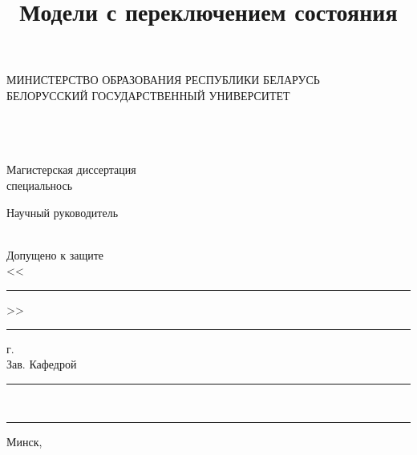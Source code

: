 \documentclass[a4paper,14pt]{extreport}
\title{Модели с переключением состояния}
\author{\@authorlast \@authorfirst}
\makeatletter
\newcommand*{\@authorfirst}{}
\newcommand*{\@authorlast}{}
\newcommand*{\@mentor}{}
\newcommand*{\@mentorjob}{}
\newcommand*{\@faculty}{}
\newcommand*{\@subfaculty}{}
\newcommand*{\@specialty}{}
\makeatother
\begin{document}
\begin{titlepage}
	\begin{center}
		\small{МИНИСТЕРСТВО ОБРАЗОВАНИЯ РЕСПУБЛИКИ БЕЛАРУСЬ}\\
		\small{БЕЛОРУССКИЙ ГОСУДАРСТВЕННЫЙ УНИВЕРСИТЕТ}\\
		\small{\MakeUppercase{\@faculty}}\\
		\@subfaculty
	\end{center}
																			  
	\vspace{5em}
																			  
	\begin{center}
		\MakeUppercase{\@authorlast} \@authorfirst \\
		\vspace{1em}
		\textbf{\MakeUppercase{\@title}} \\
		\vspace{2em}
		Магистерская диссертация \\
		специальнось \@specialty
	\end{center}
																			
	\vspace{2em}
	\begin{flushright}
		\begin{minipage}[H]{0.4\textwidth}
			\begin{flushleft}
				Научный руководитель \\
				\@mentor \\
				\@mentorjob
			\end{flushleft}
		\end{minipage}
	\end{flushright}
								
	\vspace{3em}
								
	\vfill
										
	\begin{flushleft}
		\begin{minipage}[H]{0.5\textwidth}
			\begin{flushleft}
				Допущено к защите \\
				<<\rule{1cm}{1pt}>> \rule{4cm}{1pt} \the\year г. \\
				Зав. Кафедрой \\
				\rule{6cm}{1pt} \\
				\rule{6cm}{1pt}
			\end{flushleft}
		\end{minipage}
	\end{flushleft}
																			
	\vspace{1em}
																			  
	\begin{center}
		Минск, \the\year
	\end{center}
\end{titlepage}
\end{document}
